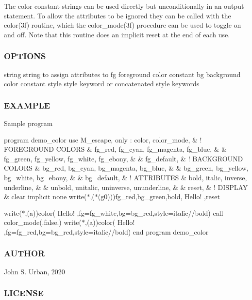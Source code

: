 The color constant strings can be used directly but unconditionally in an output statement. To allow the attributes to be ignored they can be called with the color(3f) routine, which the color\+\_\+mode(3f) procedure can be used to toggle on and off. Note that this routine does an implicit reset at the end of each use.

\subsubsection*{O\+P\+T\+I\+O\+NS}

string string to assign attributes to fg foreground color constant bg background color constant style style keyword or concatenated style keywords

\subsubsection*{E\+X\+A\+M\+P\+LE}

Sample program

program demo\+\_\+color use M\+\_\+escape, only \+: color, color\+\_\+mode, \& ! F\+O\+R\+E\+G\+R\+O\+U\+ND C\+O\+L\+O\+RS \& fg\+\_\+red, fg\+\_\+cyan, fg\+\_\+magenta, fg\+\_\+blue, \& \& fg\+\_\+green, fg\+\_\+yellow, fg\+\_\+white, fg\+\_\+ebony, \& \& fg\+\_\+default, \& ! B\+A\+C\+K\+G\+R\+O\+U\+ND C\+O\+L\+O\+RS \& bg\+\_\+red, bg\+\_\+cyan, bg\+\_\+magenta, bg\+\_\+blue, \& \& bg\+\_\+green, bg\+\_\+yellow, bg\+\_\+white, bg\+\_\+ebony, \& \& bg\+\_\+default, \& ! A\+T\+T\+R\+I\+B\+U\+T\+ES \& bold, italic, inverse, underline, \& \& unbold, unitalic, uninverse, ununderline, \& \& reset, \& ! D\+I\+S\+P\+L\+AY \& clear implicit none write($\ast$,\textquotesingle{}($\ast$(g0))\textquotesingle{})fg\+\_\+red,bg\+\_\+green,bold,\textquotesingle{} Hello! \textquotesingle{},reset

write($\ast$,\textquotesingle{}(a)\textquotesingle{})color(\textquotesingle{} Hello! \textquotesingle{},fg=fg\+\_\+white,bg=bg\+\_\+red,style=italic//bold) call color\+\_\+mode(.false.) write($\ast$,\textquotesingle{}(a)\textquotesingle{})color(\textquotesingle{} Hello! \textquotesingle{},fg=fg\+\_\+red,bg=bg\+\_\+red,style=italic//bold) end program demo\+\_\+color

\subsubsection*{A\+U\+T\+H\+OR}

John S. Urban, 2020 \subsubsection*{L\+I\+C\+E\+N\+SE}


